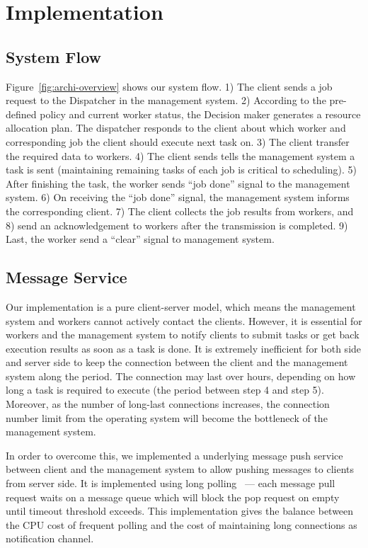 \section{Implementation}  %

\subsection{System Flow}	%

Figure~\ref{fig:archi-overview} shows our system flow.
1) The client sends a job request to the Dispatcher in the management 
system.
2) According to the pre-defined policy and current worker status, the 
Decision maker generates a resource allocation plan.
The dispatcher responds to the client about which worker and
corresponding job the client should execute next task on.
3) The client transfer the required data to workers.
4) The client sends tells the management system a task is sent
(maintaining remaining tasks of each job is critical to scheduling).
5) After finishing the task, the worker sends ``job done'' signal to the
management system.
6) On receiving the ``job done'' signal,  the management system informs
the corresponding client.
7) The client collects the job results from workers, and
8) send an acknowledgement to workers after the transmission is 
completed.
9) Last, the worker send a ``clear'' signal to management system.

\subsection{Message Service} %
Our implementation is a pure client-server model, which means the
management system and workers cannot actively contact the clients.
However, it is essential for workers and the management system to notify
clients to submit tasks or get back execution results as soon as a task
is done.
It is extremely inefficient for both side and server side to keep the
connection between the client and the management system along the
period.
The connection may last over hours, depending on how long a task is
required to execute (the period between step 4 and step 5).
Moreover, as the number of long-last connections increases, the
connection number limit from the operating system will become the
bottleneck of the management system.

In order to overcome this, we implemented a underlying message push
service between client and the management system to allow pushing
messages to clients from server side.
It is implemented using long polling~\cite{cite:push-pull} --- each
message pull request waits on a message queue which will block the pop
request on empty until timeout
threshold exceeds.
This implementation gives the balance between the CPU cost of frequent
polling and the cost of maintaining long connections as notification
channel.

